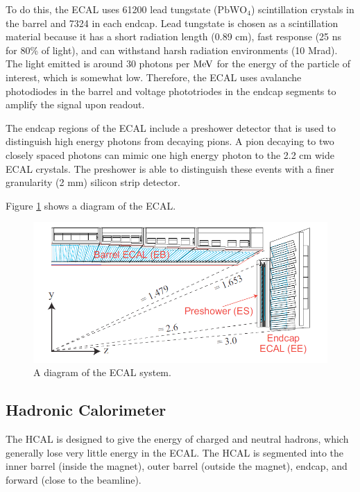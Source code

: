 To do this, the ECAL uses 61200 lead tungstate ($\mathrm{PbWO_4}$) scintillation crystals in the barrel and 7324 in each endcap.  
Lead tungstate is chosen as a scintillation material because it has a short radiation length (0.89 cm), fast response (25 ns for 80\% of light), and can 
withstand harsh radiation environments (10 Mrad).
The light emitted is around 30 photons per $\mathrm{MeV}$ for the energy of the particle of interest, which is somewhat low.  
Therefore, the ECAL uses avalanche photodiodes in the barrel and voltage phototriodes in the endcap segments to amplify the signal upon readout.  

The endcap regions of the ECAL include a preshower detector that is used to distinguish high energy photons from decaying pions.  
A pion decaying to two closely spaced photons can mimic one high energy photon to the 2.2 cm wide ECAL crystals.  
The preshower is able to distinguish these events with a finer granularity (2 mm) silicon strip detector.   
 
Figure \ref{figs:CMSecal} shows a diagram of the ECAL.    
\begin{figure}
\begin{center}
\includegraphics[width=1.0\linewidth]{figs/CMSecal.png}
\caption{A diagram of the ECAL system.}
\label{figs:CMSecal}
\end{center}
\end{figure}
  





\subsection{Hadronic Calorimeter}
The HCAL is designed to give the energy of charged and neutral hadrons, which generally lose very little energy in the ECAL.  
The HCAL is segmented into the inner barrel (inside the magnet), outer barrel (outside the magnet), endcap, and forward (close to the beamline).  

